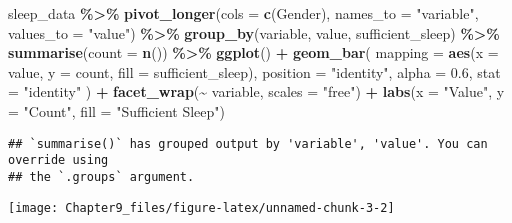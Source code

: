 \documentclass[
  11pt,
]{article}
\newenvironment{Shaded}{\begin{snugshade}}{\end{snugshade}}
\newcommand{\AttributeTok}[1]{\textcolor[rgb]{0.13,0.29,0.53}{#1}}
\newcommand{\FloatTok}[1]{\textcolor[rgb]{0.00,0.00,0.81}{#1}}
\newcommand{\FunctionTok}[1]{\textcolor[rgb]{0.13,0.29,0.53}{\textbf{#1}}}
\newcommand{\NormalTok}[1]{#1}
\newcommand{\SpecialCharTok}[1]{\textcolor[rgb]{0.81,0.36,0.00}{\textbf{#1}}}
\newcommand{\StringTok}[1]{\textcolor[rgb]{0.31,0.60,0.02}{#1}}
\begin{document}
\begin{Shaded}
\begin{Highlighting}[]
\NormalTok{sleep\_data }\SpecialCharTok{\%\textgreater{}\%}
  \FunctionTok{pivot\_longer}\NormalTok{(}\AttributeTok{cols =} \FunctionTok{c}\NormalTok{(Gender), }\AttributeTok{names\_to =} \StringTok{"variable"}\NormalTok{, }\AttributeTok{values\_to =} \StringTok{"value"}\NormalTok{) }\SpecialCharTok{\%\textgreater{}\%}
  \FunctionTok{group\_by}\NormalTok{(variable, value, sufficient\_sleep) }\SpecialCharTok{\%\textgreater{}\%}
  \FunctionTok{summarise}\NormalTok{(}\AttributeTok{count =} \FunctionTok{n}\NormalTok{()) }\SpecialCharTok{\%\textgreater{}\%}
  \FunctionTok{ggplot}\NormalTok{() }\SpecialCharTok{+}
  \FunctionTok{geom\_bar}\NormalTok{(}
    \AttributeTok{mapping =} \FunctionTok{aes}\NormalTok{(}\AttributeTok{x =}\NormalTok{ value, }\AttributeTok{y =}\NormalTok{ count, }\AttributeTok{fill =}\NormalTok{ sufficient\_sleep),}
    \AttributeTok{position =} \StringTok{"identity"}\NormalTok{,}
    \AttributeTok{alpha =} \FloatTok{0.6}\NormalTok{,}
    \AttributeTok{stat =} \StringTok{"identity"}
\NormalTok{  ) }\SpecialCharTok{+}
  \FunctionTok{facet\_wrap}\NormalTok{(}\SpecialCharTok{\textasciitilde{}}\NormalTok{ variable, }\AttributeTok{scales =} \StringTok{"free"}\NormalTok{) }\SpecialCharTok{+}
  \FunctionTok{labs}\NormalTok{(}\AttributeTok{x =} \StringTok{"Value"}\NormalTok{, }\AttributeTok{y =} \StringTok{"Count"}\NormalTok{, }\AttributeTok{fill =} \StringTok{"Sufficient Sleep"}\NormalTok{)}
\end{Highlighting}
\end{Shaded}

\begin{verbatim}
## `summarise()` has grouped output by 'variable', 'value'. You can override using
## the `.groups` argument.
\end{verbatim}

\begin{center}\texttt{[image: Chapter9\_files/figure-latex/unnamed-chunk-3-2]} \end{center}
\end{document}
